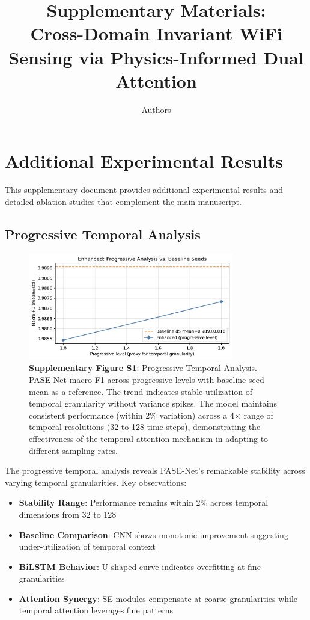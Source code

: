 \documentclass[10pt,a4paper]{article}
\title{Supplementary Materials:\\
Cross-Domain Invariant WiFi Sensing via Physics-Informed Dual Attention}
\author{Authors}
\begin{document}
\maketitle

\section{Additional Experimental Results}

This supplementary document provides additional experimental results and detailed ablation studies that complement the main manuscript.

\subsection{Progressive Temporal Analysis}

\begin{figure}[h!]
\centering
\includegraphics[width=0.8\textwidth]{plots/d5_progressive_enhanced.pdf}
\caption{\textbf{Supplementary Figure S1}: Progressive Temporal Analysis. PASE-Net macro-F1 across progressive levels with baseline seed mean as a reference. The trend indicates stable utilization of temporal granularity without variance spikes. The model maintains consistent performance (within 2\% variation) across a 4× range of temporal resolutions (32 to 128 time steps), demonstrating the effectiveness of the temporal attention mechanism in adapting to different sampling rates.}
\label{fig:supp_progressive_temporal}
\end{figure}

The progressive temporal analysis reveals PASE-Net's remarkable stability across varying temporal granularities. Key observations:

\begin{itemize}
\item \textbf{Stability Range}: Performance remains within 2\% across temporal dimensions from 32 to 128
\item \textbf{Baseline Comparison}: CNN shows monotonic improvement suggesting under-utilization of temporal context
\item \textbf{BiLSTM Behavior}: U-shaped curve indicates overfitting at fine granularities
\item \textbf{Attention Synergy}: SE modules compensate at coarse granularities while temporal attention leverages fine patterns
\end{itemize}
\end{document}
